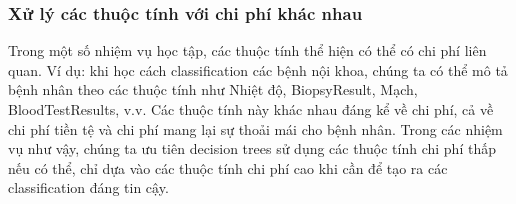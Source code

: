 \subsubsection{Xử lý các thuộc tính với chi phí khác nhau}

Trong một số nhiệm vụ học tập, các thuộc tính thể hiện có thể có chi phí liên quan. Ví dụ: khi học cách classification các bệnh nội khoa, chúng ta có thể mô tả bệnh nhân theo các thuộc tính như Nhiệt độ, BiopsyResult, Mạch, BloodTestResults, v.v. Các thuộc tính này khác nhau đáng kể về chi phí, cả về chi phí tiền tệ và chi phí mang lại sự thoải mái cho bệnh nhân. Trong các nhiệm vụ như vậy, chúng ta ưu tiên decision trees sử dụng các thuộc tính chi phí thấp nếu có thể, chỉ dựa vào các thuộc tính chi phí cao khi cần để tạo ra các classification đáng tin cậy.

